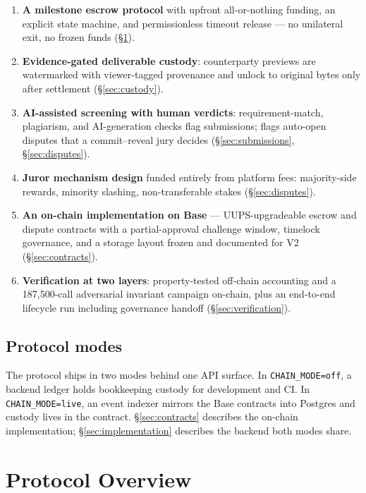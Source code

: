 \documentclass[11pt,letterpaper]{article}
\begin{document}
\begin{enumerate}
\item \textbf{A milestone escrow protocol} with upfront all-or-nothing funding, an
explicit state machine, and permissionless timeout release --- no unilateral exit,
no frozen funds (\S\ref{sec:lifecycle}).
\item \textbf{Evidence-gated deliverable custody}: counterparty previews are
watermarked with viewer-tagged provenance and unlock to original bytes only after
settlement (\S\ref{sec:custody}).
\item \textbf{AI-assisted screening with human verdicts}: requirement-match,
plagiarism, and AI-generation checks flag submissions; flags auto-open disputes that
a commit--reveal jury decides (\S\ref{sec:submissions}, \S\ref{sec:disputes}).
\item \textbf{Juror mechanism design} funded entirely from platform fees: majority-side
rewards, minority slashing, non-transferable stakes (\S\ref{sec:disputes}).
\item \textbf{An on-chain implementation on Base} --- UUPS-upgradeable escrow and
dispute contracts with a partial-approval challenge window, timelock governance, and
a storage layout frozen and documented for V2 (\S\ref{sec:contracts}).
\item \textbf{Verification at two layers}: property-tested off-chain accounting and a
187{,}500-call adversarial invariant campaign on-chain, plus an end-to-end lifecycle
run including governance handoff (\S\ref{sec:verification}).
\end{enumerate}

\subsection{Protocol modes}

The protocol ships in two modes behind one API surface. In \texttt{CHAIN\_MODE=off},
a backend ledger holds bookkeeping custody for development and CI. In
\texttt{CHAIN\_MODE=live}, an event indexer mirrors the Base contracts into Postgres
and custody lives in the contract. \S\ref{sec:contracts} describes the on-chain
implementation; \S\ref{sec:implementation} describes the backend both modes share.

\section{Protocol Overview}\label{sec:lifecycle}
\end{document}
